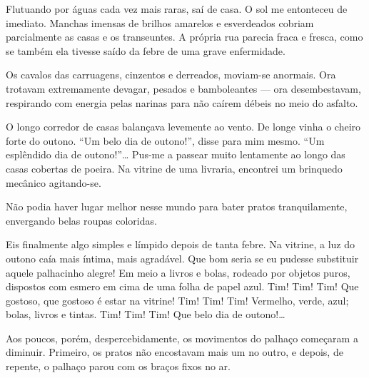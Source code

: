 
Flutuando por águas cada vez mais raras, saí de casa. O sol me entonteceu de
imediato. Manchas imensas de brilhos amarelos e esverdeados cobriam
parcialmente as casas e os transeuntes. A própria rua parecia fraca e fresca,
como se também ela tivesse saído da febre de uma grave enfermidade.

Os cavalos das carruagens, cinzentos e derreados, moviam-se anormais. Ora
trotavam extremamente devagar, pesados e bamboleantes --- ora desembestavam,
respirando com energia pelas narinas para não caírem débeis no meio do
asfalto.

O longo corredor de casas balançava levemente ao vento. De longe vinha o
cheiro forte do outono. ``Um belo dia de outono!'', disse para mim mesmo.
``Um esplêndido dia de outono!''\ldots{} Pus-me a passear muito lentamente ao
longo das casas cobertas de poeira. Na vitrine de uma livraria, encontrei um
brinquedo mecânico agitando-se.



Não podia haver lugar melhor nesse mundo para bater pratos tranquilamente,
envergando belas roupas coloridas.

Eis finalmente algo simples e límpido depois de tanta febre. Na vitrine, a luz
do outono caía mais íntima, mais agradável. Que bom seria se eu pudesse
substituir aquele palhacinho alegre! Em meio a livros e bolas, rodeado por
objetos puros, dispostos com esmero em cima de uma folha de papel azul. Tim!
Tim! Tim! Que gostoso, que gostoso é estar na vitrine! Tim! Tim! Tim!
Vermelho, verde, azul; bolas, livros e tintas. Tim! Tim! Tim! Que belo dia de
outono!\ldots{}

Aos poucos, porém, despercebidamente, os movimentos do palhaço começaram a
diminuir. Primeiro, os pratos não encostavam mais um no outro, e depois, de
repente, o palhaço parou com os braços fixos no ar.

